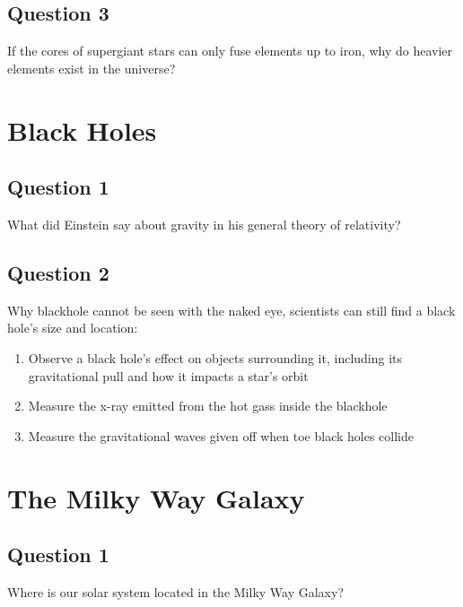 \subsection{Question 3}
If the cores of supergiant stars can only fuse elements up to iron, why do heavier elements exist in the universe?

\section{Black Holes}
\subsection{Question 1}
What did Einstein say about gravity in his general theory of relativity?\\

\subsection{Question 2}
Why blackhole cannot be seen with the naked eye, scientists can still find a black hole's size and location:\\
\begin{enumerate}
    \item Observe a black hole's effect on objects surrounding it, including its gravitational pull and how it impacts a star's orbit
    \item Measure the x-ray emitted from the hot gass inside the blackhole
    \item Measure the gravitational waves given off when toe black holes collide
\end{enumerate}

\section{The Milky Way Galaxy}
\subsection{Question 1}
Where is our solar system located in the Milky Way Galaxy? \\
